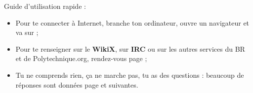 \vfill


Guide d'utilisation rapide :
\begin{itemize}
\item Pour te connecter à Internet, branche ton ordinateur, ouvre un navigateur et va sur  ;
\item Pour te renseigner sur le \textbf{WikiX}, sur \textbf{IRC} ou sur les autres services du BR et de Polytechnique.org, rendez-vous page \pageref{services} ;
\item Tu ne comprends rien, ça ne marche pas, tu as des questions : beaucoup de réponses sont données page \pageref{faq} et suivantes.

\end{itemize}
